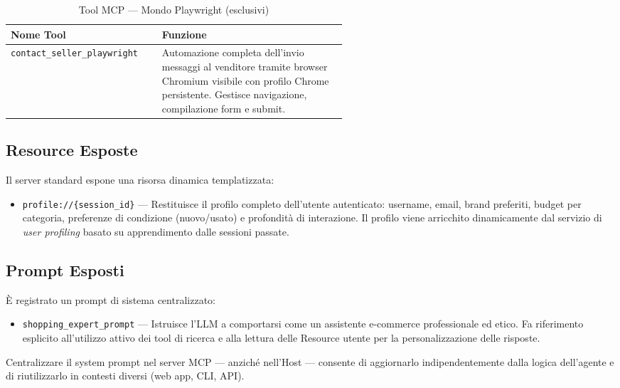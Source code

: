 \begin{table}[htbp]
\centering
\caption{Tool MCP — Mondo Playwright (esclusivi)}
\label{tab:mcp-tools-playwright}
\begin{tabular}{lp{0.55\linewidth}}
\hline
\textbf{Nome Tool} & \textbf{Funzione} \\
\hline
\texttt{contact\_seller\_playwright} & Automazione completa dell'invio messaggi al venditore tramite browser Chromium visibile con profilo Chrome persistente. Gestisce navigazione, compilazione form e submit. \\
\hline
\end{tabular}
\end{table}

\subsection{Resource Esposte}
\label{subsec:mcp-resources}

Il server standard espone una risorsa dinamica templatizzata:

\begin{itemize}
    \item \texttt{profile://\{session\_id\}} — Restituisce il profilo
        completo dell'utente autenticato: username, email, brand
        preferiti, budget per categoria, preferenze di condizione
        (nuovo/usato) e profondità di interazione. Il profilo viene
        arricchito dinamicamente dal servizio di \emph{user profiling}
        basato su apprendimento dalle sessioni passate.
\end{itemize}

\subsection{Prompt Esposti}
\label{subsec:mcp-prompts}

È registrato un prompt di sistema centralizzato:

\begin{itemize}
    \item \texttt{shopping\_expert\_prompt} — Istruisce l'LLM a
        comportarsi come un assistente e-commerce professionale ed
        etico. Fa riferimento esplicito all'utilizzo attivo dei tool
        di ricerca e alla lettura delle Resource utente per la
        personalizzazione delle risposte.
\end{itemize}

Centralizzare il system prompt nel server MCP — anziché nell'Host —
consente di aggiornarlo indipendentemente dalla logica dell'agente e di
riutilizzarlo in contesti diversi (web app, CLI, API).

